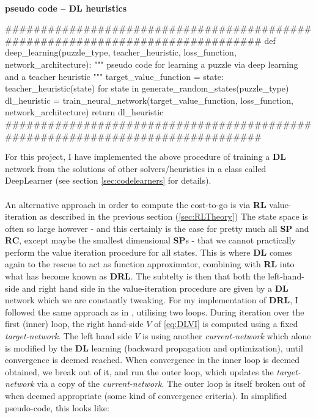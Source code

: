 \paragraph{}{\textbf{pseudo code -- \textbf{DL} heuristics}}
\begin{python}
###############################################################################
def deep_learning(puzzle_type,
                  teacher_heuristic,
                  loss_function,
                  network_architecture):
    """ pseudo code for learning a puzzle via deep learning and a teacher heuristic """
    target_value_function = {state: teacher_heuristic(state)
                             for state in generate_random_states(puzzle_type)}
    dl_heuristic = train_neural_network(target_value_function,
                                        loss_function,
                                        network_architecture)
    return dl_heuristic
###############################################################################
\end{python}
\black

For this project, I have implemented the above procedure of training a \textbf{DL} network from the solutions of other solvers/heuristics in a class called DeepLearner (see section \ref{sec:codelearners} for details).
\\
\\
An alternative approach in order to compute the cost-to-go is via \textbf{RL} value-iteration as described in the previous section (\ref{sec:RLTheory}) The state space is often so large however - and this certainly is the case for pretty much all \textbf{SP} and \textbf{RC}, except maybe the smallest dimensional \textbf{SP}s - that we cannot practically perform the value iteration procedure for all states. This is where \textbf{DL} comes again to the rescue to act as function approximator, combining with \textbf{RL} into what has become known as \textbf{DRL}. The subtelty is then that both the left-hand-side and right hand side in the value-iteration procedure are given by a \textbf{DL} network which we are constantly tweaking. For my implementation of \textbf{DRL}, I followed the same approach as in \cite{Mnih2013}, utilising two loops. During iteration over the first (inner) loop, the right hand-side $V$ of \ref{eq:DLVI} is computed using a fixed \textit{target-network}. The left hand side $V$ is using another \textit{current-network} which alone is modified by the \textbf{DL} learning (backward propagation and optimization), until convergence is deemed reached. When convergence in the inner loop is deemed obtained, we break out of it, and run the outer loop, which updates the \textit{target-network} via a copy of the \textit{current-network}. The outer loop is itself broken out of when deemed appropriate (some kind of convergence criteria). In simplified pseudo-code, this looks like:
\\
\\
\afblue
